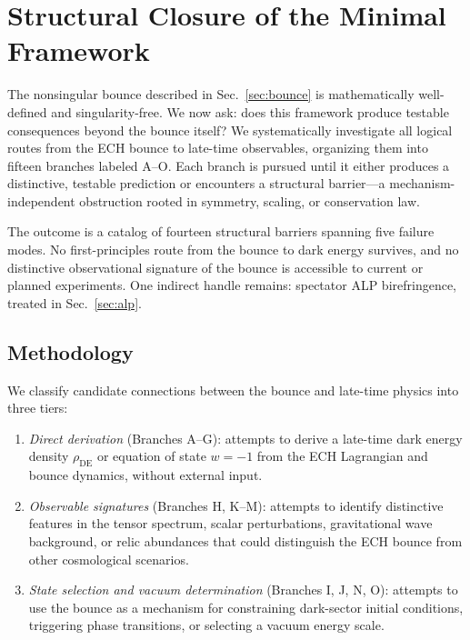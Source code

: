 
\section{Structural Closure of the Minimal Framework}
\label{sec:closure}

The nonsingular bounce described in Sec.~\ref{sec:bounce} is mathematically
well-defined and singularity-free.  We now ask: does this framework produce
testable consequences beyond the bounce itself?  We systematically investigate
all logical routes from the ECH bounce to late-time observables, organizing
them into fifteen branches labeled A--O.  Each branch is pursued until it
either produces a distinctive, testable prediction or encounters a structural
barrier---a mechanism-independent obstruction rooted in symmetry, scaling, or
conservation law.

The outcome is a catalog of fourteen structural barriers spanning five failure
modes.  No first-principles route from the bounce to dark energy survives, and
no distinctive observational signature of the bounce is accessible to current
or planned experiments.  One indirect handle remains: spectator ALP
birefringence, treated in Sec.~\ref{sec:alp}.


\subsection{Methodology}
\label{sec:closure_method}

We classify candidate connections between the bounce and late-time physics into
three tiers:

\begin{enumerate}
\item \emph{Direct derivation} (Branches A--G): attempts to derive a late-time
  dark energy density $\rho_\mathrm{DE}$ or equation of state $w=-1$ from the
  ECH Lagrangian and bounce dynamics, without external input.

\item \emph{Observable signatures} (Branches H, K--M): attempts to identify
  distinctive features in the tensor spectrum, scalar perturbations,
  gravitational wave background, or relic abundances that could distinguish the
  ECH bounce from other cosmological scenarios.

\item \emph{State selection and vacuum determination} (Branches I, J, N, O):
  attempts to use the bounce as a mechanism for constraining dark-sector
  initial conditions, triggering phase transitions, or selecting a vacuum
  energy scale.
\end{enumerate}


